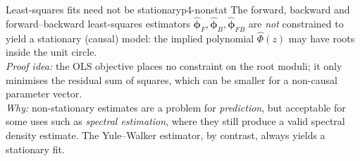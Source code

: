 \begin{proposition}{Least-squares fits need not be stationary}{p4-nonstat}
The forward, backward and forward--backward least-squares estimators
$\hat{\boldsymbol\phi}_F,\hat{\boldsymbol\phi}_B,\hat{\boldsymbol\phi}_{FB}$ are
\emph{not} constrained to yield a stationary (causal) model: the implied
polynomial $\hat\Phi(z)$ may have roots inside the unit circle.\\[2pt]
\textit{Proof idea:} the OLS objective places no constraint on the root moduli;
it only minimises the residual sum of squares, which can be smaller for a
non-causal parameter vector.\\
\textit{Why:} non-stationary estimates are a problem for \emph{prediction}, but
acceptable for some uses such as \emph{spectral estimation}, where they still
produce a valid spectral density estimate. The Yule--Walker estimator, by
contrast, always yields a stationary fit.
\end{proposition}

